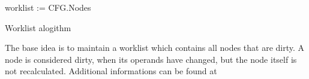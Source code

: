 \begin{algorithm}[H]
	worklist := {CFG.Nodes}\;
	\caption{Worklist alogithm}
	\label{worklist}
\end{algorithm}

The base idea is to maintain a worklist which contains all nodes that are dirty. A node is considered dirty, when its operands have changed, but the node itself is not recalculated. Additional informations can be found at \cite{iterative-data-flow-analysis-revisited}
